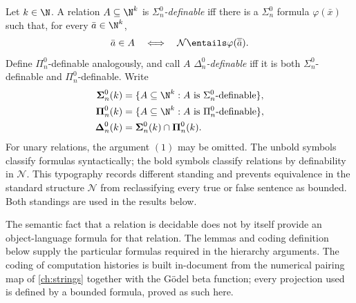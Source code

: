 \begin{definition}
Let \(k\in\N\).  A relation \(A\subseteq\N^k\) is
\emph{\(\Sigma^0_n\)-definable} iff there is a \(\Sigma^0_n\) formula
\(\varphi(\bar x)\) such that, for every \(\bar a\in\N^k\),
\[
  \bar a\in A
  \quad\Longleftrightarrow\quad
  \mathcal N\entails\varphi(\overline{\bar a}).
\]
Define \(\Pi^0_n\)-definable analogously, and call \(A\)
\emph{\(\Delta^0_n\)-definable} iff it is both
\(\Sigma^0_n\)-definable and \(\Pi^0_n\)-definable.  Write
\[
\begin{aligned}
 \boldsymbol{\Sigma}^0_n(k)&=\{A\subseteq\N^k:A\text{ is }
       \Sigma^0_n\text{-definable}\},\\
 \boldsymbol{\Pi}^0_n(k)&=\{A\subseteq\N^k:A\text{ is }
       \Pi^0_n\text{-definable}\},\\
 \boldsymbol{\Delta}^0_n(k)&=
       \boldsymbol{\Sigma}^0_n(k)\cap\boldsymbol{\Pi}^0_n(k).
\end{aligned}
\]
For unary relations, the argument \((1)\) may be omitted.  The unbold symbols
classify formulas syntactically; the bold symbols classify relations by
definability in \(\mathcal N\).  This typography records different standing
and prevents equivalence in the standard structure \(\mathcal N\) from
reclassifying every true or
false sentence as bounded.  Both standings are used in the results below.
\end{definition}

The semantic fact that a relation is decidable does not by itself provide an
object-language formula for that relation.  The lemmas and coding
definition below supply the particular formulas required in the hierarchy
arguments.  The coding of computation histories is built in-document from
the numerical pairing map of \cref{ch:strings} together with the G\"odel
beta function; every projection used is defined by a bounded formula,
proved as such here.

